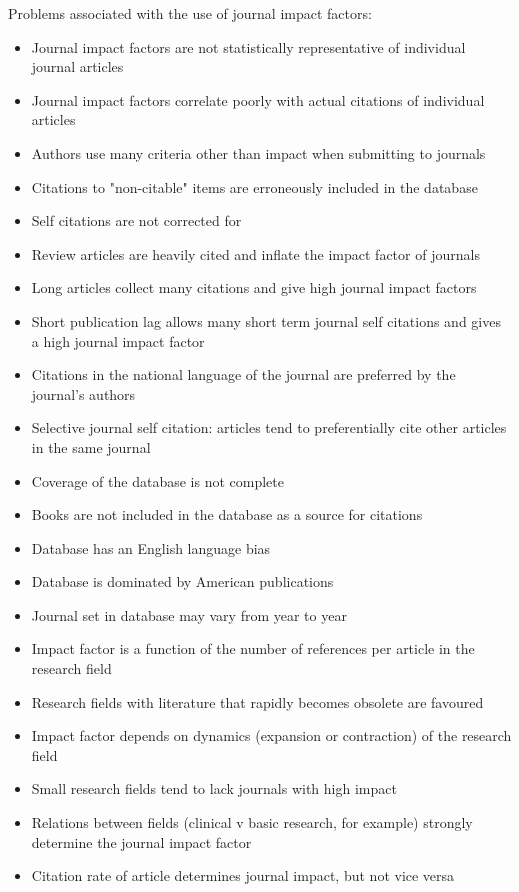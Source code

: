 \documentclass[11pt, a4paper]{article}
\begin{document}
Problems associated with the use of journal impact factors:
\begin{itemize}
    \item Journal impact factors are not statistically representative of individual journal articles
    \item Journal impact factors correlate poorly with actual citations of individual articles
    \item Authors use many criteria other than impact when submitting to journals
    \item Citations to "non-citable" items are erroneously included in the database
    \item Self citations are not corrected for
    \item Review articles are heavily cited and inflate the impact factor of journals
    \item Long articles collect many citations and give high journal impact factors
    \item Short publication lag allows many short term journal self citations and gives a high journal impact factor
    \item Citations in the national language of the journal are preferred by the journal's authors
    \item Selective journal self citation: articles tend to preferentially cite other articles in the same journal
    \item Coverage of the database is not complete
    \item Books are not included in the database as a source for citations
    \item Database has an English language bias
    \item Database is dominated by American publications
    \item Journal set in database may vary from year to year
    \item Impact factor is a function of the number of references per article in the research field
    \item Research fields with literature that rapidly becomes obsolete are favoured
    \item Impact factor depends on dynamics (expansion or contraction) of the research field
    \item Small research fields tend to lack journals with high impact
    \item Relations between fields (clinical v basic research, for example) strongly determine the journal impact factor
    \item Citation rate of article determines journal impact, but not vice versa
\end{itemize}
\end{document}
